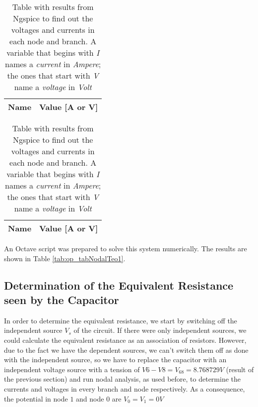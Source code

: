 \hfill

\begin{table}
  \parbox{.45\linewidth}{
    \centering
    \begin{tabular}{|c|c|}
      \hline
      {\bf Name} & {\bf Value [A or V]} \\ \hline
      
    \end{tabular}
    \label{tab:op_tabNodalTeo1}
    \caption{Results of Nodal Analysis of the circuit for t < 0. A variable that begins  with \textit{I} names a \textit{current} in \textit{Ampere}; the ones that start with \textit{V} name a \textit{voltage} in \textit{Volt}}
  }
  \hfill
  \parbox{.45\linewidth}{
    \centering
    \begin{tabular}{|c|c|}
      {\bf Name} & {\bf Value [A or V]} \\ \hline
      
      \hline
    \end{tabular}
    \label{tab:op_tabNodalSpice1}
    \caption{Table with results from Ngspice to find out the voltages and currents in each node and branch. A variable that begins  with \textit{I} names a \textit{current} in \textit{Ampere}; the ones that start with \textit{V} name a \textit{voltage} in \textit{Volt} }
  }
\end{table}



An Octave script was prepared to solve this system numerically. The results are shown in Table \ref{tab:op_tabNodalTeo1}.




\subsection{Determination of the Equivalent Resistance seen by the Capacitor}

In order to determine the equivalent resistance, we start by switching off the independent source $V_s$ of the circuit. If there were only independent sources, we could calculate the equivalent resistance
as an association of resistors. However, due to the fact we have the dependent sources, we can't switch them off as done with the independent source, so we have to replace the capacitor with an independent voltage source with a tension of $V6-V8 = V_{68} = 8.768729 V$ (result of the previous section)
and run nodal analysis, as used before,
to determine the currents and voltages in every branch and node respectively. As a consequence, the potential in node $1$ and node $0$ are $V_0 = V_1 = 0 V$

